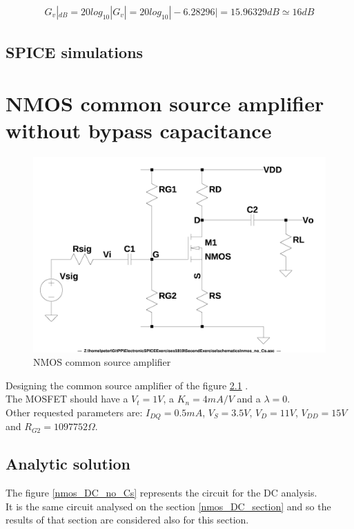 \documentclass[10pt,a4paper]{book}
\begin{document}
\begin{align}
G_v|_{dB} = 20 log_{10} |G_v| = 20 log_{10} |-6.28296| = 15.96329 dB \simeq 16 dB
\end{align}

\section{SPICE simulations}

\chapter{NMOS common source amplifier without bypass capacitance}
\begin{figure}[h]
  \centering
  \includegraphics[width=12cm]{schematics/nmos_no_Cs.jpg}
  \caption{NMOS common source amplifier}
  \label{nmos_no_Cs}
\end{figure}

Designing the common source amplifier of the figure \ref{nmos_no_Cs} .\\
The MOSFET should have a $V_t = 1V$, a $K_n = 4mA/V$ and a $\lambda = 0$.\\
Other requested parameters are: $I_{DQ} = 0.5mA$, $V_S = 3.5V$, $V_D = 11V$, $V_{DD} = 15V$ and $R_{G2} = 1097752\Omega$.\par

\section{Analytic solution}
The figure \ref{nmos_DC_no_Cs} represents the circuit for the DC analysis.\\
It is the same circuit analysed on the section \ref{nmos_DC_section} and so the results of that section are considered also for this section.\par
\end{document}
